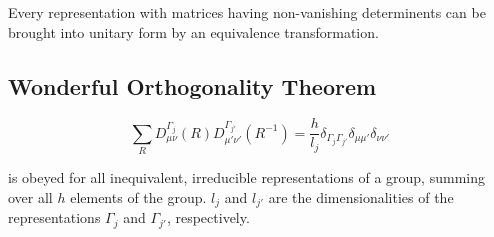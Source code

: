 \begin{thm}\label{thm:21_unitary-repr}
Every representation with matrices having non-vanishing determinents can be brought into unitary form by an equivalence transformation.
\end{thm}

\subsection{Wonderful Orthogonality Theorem}
\begin{thm}\label{thm:22_w-o-t}
\begin{equation*}
\sum_R D_{\mu\nu}^{\Gamma_j}(R)D_{\mu'\nu'}^{\Gamma_{j'}}(R^{-1}) = \frac{h}{l_j} \delta_{\Gamma_{j}\Gamma_{j'}}\delta_{\mu \mu'}\delta_{\nu\nu'}
\end{equation*}

is obeyed for all inequivalent, irreducible representations of a group, summing over all $h$ elements of the group. $l_j$ and $l_{j'}$ are the dimensionalities of the representations $\Gamma_{j}$ and $\Gamma_{j'}$, respectively.
\end{thm}